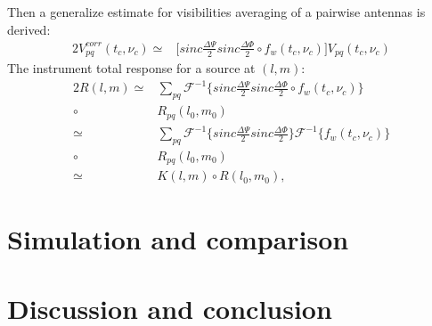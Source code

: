 Then a generalize estimate for visibilities averaging of a pairwise antennas is derived:
\begin{alignat*}{2}
 V_{pq}^{corr}(t_c, \nu_c)\simeq& \bigg[sinc\frac{\Delta \Psi}{2}sinc\frac{\Delta \Phi}{2}\circ f_{w}(t_c,\nu_c)\bigg]
			   V_{pq}(t_{c},\nu_{c})
\end{alignat*}
The  instrument total response for a source at $(l,m)$:
\begin{alignat*}{2}
R(l,m)\simeq& \sum_{pq}\mathcal{F}^{-1}\bigg\{sinc\frac{\Delta \Psi}{2}sinc\frac{\Delta \Phi}{2}\circ f_{w}(t_c,\nu_c)\bigg\}\\
	\circ& R_{pq}(l_0,m_0)\\
	\simeq& \sum_{pq}\mathcal{F}^{-1}\bigg\{sinc\frac{\Delta \Psi}{2}sinc\frac{\Delta 
\Phi}{2}\bigg\}\mathcal{F}^{-1}\bigg\{f_{w}(t_c,\nu_c)\bigg\}\\
	\circ& R_{pq}(l_0,m_0)\\
	\simeq& K(l,m)\circ R(l_0,m_0),
\end{alignat*}
\section{Simulation and comparison}
\section{Discussion and conclusion}